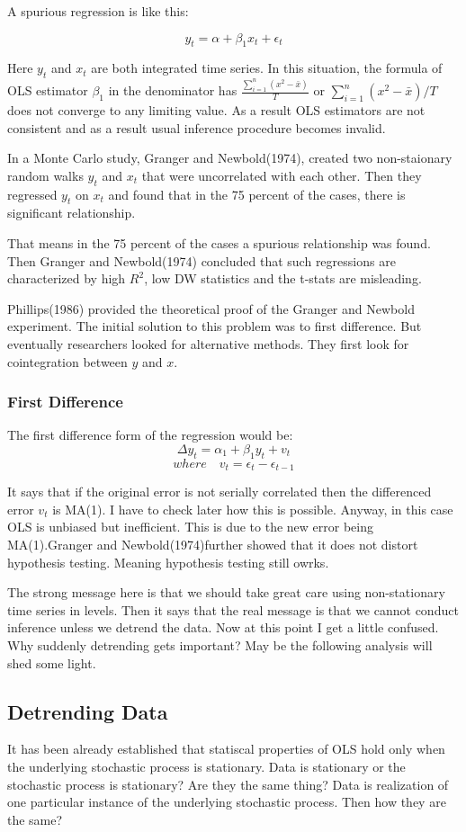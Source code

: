 \documentclass{book}
\begin{document}
 A spurious regression is like this:
 
 $$y_t=\alpha+\beta_1  x_t+ \epsilon_t$$
 
 Here $y_t$ and $x_t$ are both integrated time series. In this situation, the formula of OLS estimator $\beta_1$ in the denominator has $\frac{\sum_{i=1}^{n}{(x^2-\bar{x})}}{T}$  or $\sum_{i=1}^{n}{(x^2-\bar{x})}/T$ does not converge to any limiting value. As a result OLS estimators are not consistent and as a result usual inference procedure becomes invalid. 
 
 In a Monte Carlo study, Granger and Newbold(1974), created two non-staionary random walks $y_t$ and $x_t$ that were uncorrelated with each other. Then they regressed  $y_t$ on $x_t$ and found that in the 75 percent of the cases, there is significant relationship. 
 
 That means in the 75 percent of the cases a spurious relationship was found. Then Granger and Newbold(1974) concluded that such regressions are characterized by  high $R^2$, low DW statistics and the t-stats are misleading.
 
 Phillips(1986) provided the theoretical proof of the Granger and Newbold experiment. The initial solution to this problem was to first difference. But eventually researchers looked for alternative methods. They first look for cointegration between $y$ and $x$.  
 
 \subsubsection*{First Difference}
The first difference form of the regression would be: 
$$\Delta y_t=\alpha_1+\beta_1 y_t+v_t$$
$$where \quad v_t=\epsilon_t-\epsilon_{t-1}$$

It says that if the original error is not serially correlated then the differenced error $v_t$ is MA(1). I have to check later how this is possible. Anyway, in this case OLS is unbiased but inefficient. This is due to the new error being MA(1).Granger and Newbold(1974)further showed that it does not distort hypothesis testing. Meaning hypothesis testing still owrks. 

The strong message here is that we should take great care using non-stationary time series in levels. Then it says that the real message is that we cannot conduct inference unless we detrend the data. Now at this
point I get a little confused. Why suddenly detrending gets important? May be the following analysis will shed some light.
\subsection{Detrending Data}
It has been already established that statiscal properties of OLS hold only when the underlying stochastic process is stationary. Data is stationary or the stochastic process is stationary? Are they the same thing? Data is realization of one particular instance of the underlying stochastic process. Then how they are the same?
\end{document}
